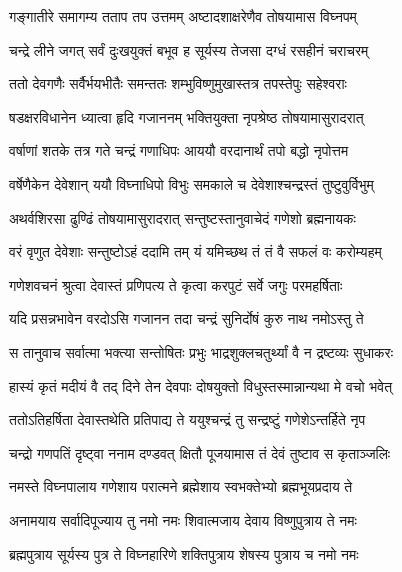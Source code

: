 \twolineshloka
{गङ्गातीरे समागम्य तताप तप उत्तमम्}
{अष्टादशाक्षरेणैव तोषयामास विघ्नपम्} %

\twolineshloka
{चन्द्रे लीने जगत् सर्वं दुःखयुक्तं बभूव ह}
{सूर्यस्य तेजसा दग्धं रसहीनं चराचरम्} %

\twolineshloka
{ततो देवगणैः सर्वैर्भयभीतैः समन्ततः}
{शम्भुविष्णुमुखास्तत्र तपस्तेपुः सहेश्वराः} %

\twolineshloka
{षडक्षरविधानेन ध्यात्वा हृदि गजाननम्}
{भक्तियुक्ता नृपश्रेष्ठ तोषयामासुरादरात्} %

\twolineshloka
{वर्षाणां शतके तत्र गते चन्द्रं गणाधिपः}
{आययौ वरदानार्थं तपो बद्धो नृपोत्तम} %

\twolineshloka
{वर्षेणैकेन देवेशान् ययौ विघ्नाधिपो विभुः}
{समकाले च देवेशाश्चन्द्रस्तं तुष्टुवुर्विभुम्} %

\twolineshloka
{अथर्वशिरसा ढुण्ढिं तोषयामासुरादरात्}
{सन्तुष्टस्तानुवाचेदं गणेशो ब्रह्मनायकः} %


\twolineshloka
{वरं वृणुत देवेशाः सन्तुष्टोऽहं ददामि तम्}
{यं यमिच्छथ तं तं वै सफलं वः करोम्यहम्} %

\twolineshloka
{गणेशवचनं श्रुत्वा देवास्तं प्रणिपत्य ते}
{कृत्वा करपुटं सर्वे जगुः परमहर्षिताः} %


\twolineshloka
{यदि प्रसन्नभावेन वरदोऽसि गजानन}
{तदा चन्द्रं सुनिर्दोषं कुरु नाथ नमोऽस्तु ते} %

\twolineshloka
{स तानुवाच सर्वात्मा भक्त्या सन्तोषितः प्रभुः}
{भाद्रशुक्लचतुर्थ्यां वै न द्रष्टव्यः सुधाकरः} %

\twolineshloka
{हास्यं कृतं मदीयं वै तद् दिने तेन देवपाः}
{दोषयुक्तो विधुस्तस्मान्नान्यथा मे वचो भवेत्} %

\twolineshloka
{ततोऽतिहर्षिता देवास्तथेति प्रतिपाद्य ते}
{ययुश्चन्द्रं तु सन्द्रष्टुं गणेशेऽन्तर्हिते नृप} %

\twolineshloka
{चन्द्रो गणपतिं दृष्ट्वा ननाम दण्डवत् क्षितौ}
{पूजयामास तं देवं तुष्टाव स कृताञ्जलिः} %


\twolineshloka
{नमस्ते विघ्नपालाय गणेशाय परात्मने}
{ब्रह्मेशाय स्वभक्तेभ्यो ब्रह्मभूयप्रदाय ते} %

\twolineshloka
{अनामयाय सर्वादिपूज्याय तु नमो नमः}
{शिवात्मजाय देवाय विष्णुपुत्राय ते नमः} %

\twolineshloka
{ब्रह्मपुत्राय सूर्यस्य पुत्र ते विघ्नहारिणे}
{शक्तिपुत्राय शेषस्य पुत्राय च नमो नमः} %

